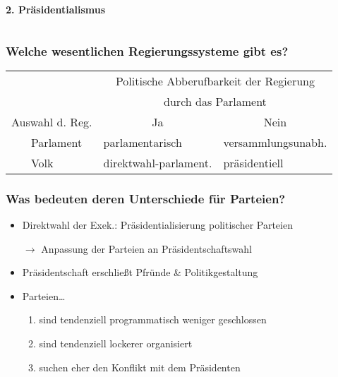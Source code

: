 \documentclass{beamer}
\begin{document}
\begin{frame}
\begin{columns}
\begin{column}{.5\textwidth}
\begin{block}{\textbf{2. Präsidentialismus}}
\end{block}
\end{column}
\end{columns}
\end{frame}

\begin{frame}
\frametitle{Welche wesentlichen Regierungssysteme gibt es?}
\begin{tabular}{*{4}{l}}
~ & ~ & \multicolumn{2}{c}{Politische Abberufbarkeit der Regierung} \\
~ & ~ & \multicolumn{2}{c}{durch das Parlament} \\
\multicolumn{2}{l}{Auswahl d. Reg.} & \multicolumn{1}{c}{Ja} & \multicolumn{1}{c}{Nein} \\
\cmidrule{3-4}
~ & Parlament & parlamentarisch & versammlungsunabh.\\
~ & Volk & direktwahl-parlament. & präsidentiell\\
\end{tabular}
\end{frame}

\begin{frame}
\frametitle{Was bedeuten deren Unterschiede für Parteien?}
\begin{itemize}
  \item Direktwahl der Exek.: Präsidentialisierung politischer Parteien
  \item [$\rightarrow$] Anpassung der Parteien an Präsidentschaftswahl
  \item Präsidentschaft erschließt Pfründe \& Politikgestaltung
  \item Parteien\dots
  \begin{enumerate}
    \item sind tendenziell programmatisch weniger geschlossen
    \item sind tendenziell lockerer organisiert
    \item suchen eher den Konflikt mit dem Präsidenten
  \end{enumerate}
\end{itemize}
\end{frame}
\end{document}
